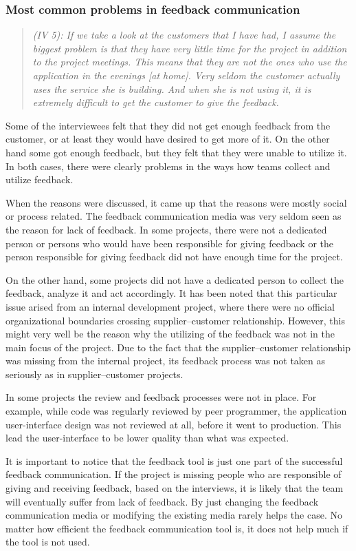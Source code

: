 \documentclass[english,12pt,a4paper,pdftex]{article}
\newcommand{\q}[2]{
\begin{quote}
\emph{(IV #1): #2}
\end{quote}}
\begin{document}
\subsubsection{Most common problems in feedback communication}

\q{5}{If we take a look at the customers that I have had, I assume the biggest problem is that they have very little time for the project in addition to the project meetings. This means that they are not the ones who use the application in the evenings [at home]. Very seldom the customer actually uses the service she is building. And when she is not using it, it is extremely difficult to get the customer to give the feedback.}

Some of the interviewees felt that they did not get enough feedback from the customer, or at least they would have desired to get more of it. On the other hand some got enough feedback, but they felt that they were unable to utilize it. In both cases, there were clearly problems in the ways how teams collect and utilize feedback.

When the reasons were discussed, it came up that the reasons were mostly social or process related. The feedback communication media was very seldom seen as the reason for lack of feedback. In some projects, there were not a dedicated person or persons who would have been responsible for giving feedback or the person responsible for giving feedback did not have enough time for the project. 

On the other hand, some projects did not have a dedicated person to collect the feedback, analyze it and act accordingly. It has been noted that this particular issue arised from an internal development project, where there were no official organizational boundaries crossing supplier--customer relationship. However, this might very well be the reason why the utilizing of the feedback was not in the main focus of the project. Due to the fact that the supplier--customer relationship was missing from the internal project, its feedback process was not taken as seriously as in supplier--customer projects.

In some projects the review and feedback processes were not in place. For example, while code was regularly reviewed by peer programmer, the application user-interface design was not reviewed at all, before it went to production. This lead the user-interface to be lower quality than what was expected.

It is important to notice that the feedback tool is just one part of the successful feedback communication. If the project is missing people who are responsible of giving and receiving feedback, based on the interviews, it is likely that the team will eventually suffer from lack of feedback. By just changing the feedback communication media or modifying the existing media rarely helps the case. No matter how efficient the feedback communication tool is, it does not help much if the tool is not used.
\end{document}
